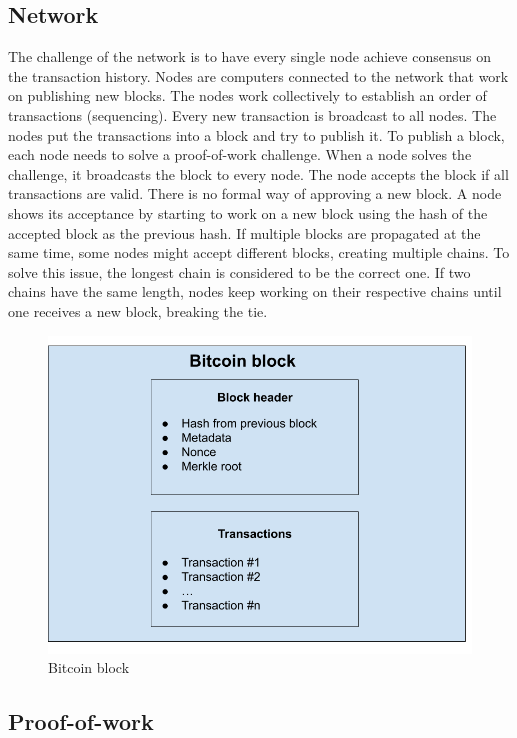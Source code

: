 \subsection{Network}
The challenge of the network is to have every single node achieve consensus on the transaction history. Nodes are computers connected to the network
that work on publishing new blocks. The nodes work collectively to establish an order of transactions (sequencing). Every new transaction is broadcast to all nodes.
The nodes put the transactions into a block and try to publish it. To publish a block, each node needs to solve a proof-of-work challenge.
When a node solves the challenge, it broadcasts the block to every node. The node accepts the block if all transactions are valid. There is no formal
way of approving a new block. A node shows its acceptance by starting to work on a new block using the hash of the accepted block as the previous hash.
If multiple blocks are propagated at the same time, some nodes might accept different blocks, creating multiple chains. To solve this issue, the longest chain is considered to be the correct one.
If two chains have the same length, nodes keep working on their respective chains until one receives a new block, breaking the tie.

\begin{figure}[H]
   \centering
   \includegraphics[width=130mm]{BitcoinBlock.png}
   \caption{Bitcoin block}
   \label{overflow}
   \end{figure}


\subsection{Proof-of-work}

